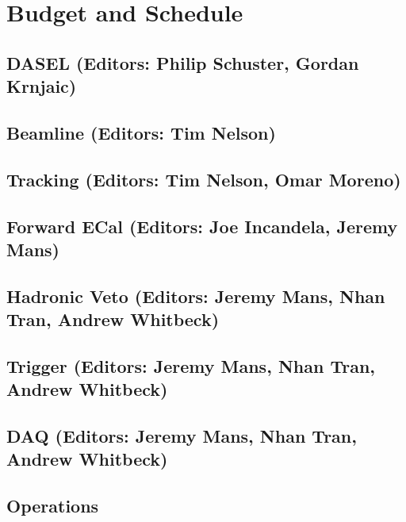 \section{Budget and Schedule}

\subsection{DASEL (Editors: Philip Schuster, Gordan Krnjaic)}

\subsection{Beamline (Editors: Tim Nelson)}

\subsection{Tracking (Editors: Tim Nelson, Omar Moreno)}

\subsection{Forward ECal (Editors: Joe Incandela, Jeremy Mans)}

\subsection{Hadronic Veto (Editors: Jeremy Mans, Nhan Tran, Andrew Whitbeck)}

\subsection{Trigger (Editors: Jeremy Mans, Nhan Tran, Andrew Whitbeck)}

\subsection{DAQ (Editors: Jeremy Mans, Nhan Tran, Andrew Whitbeck)}

\subsection{Operations}

